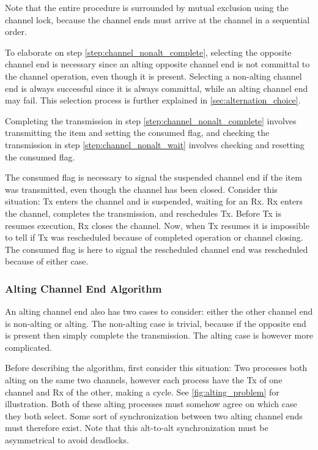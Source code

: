 Note that the entire procedure is surrounded by mutual exclusion using the channel lock, because the channel ends must arrive at the channel in a sequential order.

To elaborate on step \ref{step:channel_nonalt_complete}, selecting the opposite channel end is necessary since an alting opposite channel end is not committal to the channel operation, even though it is present. Selecting a non\hyp{}alting channel end is always successful since it is always committal, while an alting channel end may fail. This selection process is further explained in \cref{sec:alternation_choice}.

Completing the transmission in step \ref{step:channel_nonalt_complete} involves transmitting the item and setting the consumed flag, and checking the transmission in step \ref{step:channel_nonalt_wait} involves checking and resetting the consumed flag.

The consumed flag is necessary to signal the suspended channel end if the item was transmitted, even though the channel has been closed. Consider this situation: Tx enters the channel and is suspended, waiting for an Rx. Rx enters the channel, completes the transmission, and reschedules Tx. Before Tx is resumes execution, Rx closes the channel. Now, when Tx resumes it is impossible to tell if Tx was rescheduled because of completed operation or channel closing. The consumed flag is here to signal the rescheduled channel end was rescheduled because of either case.


\subsubsection{Alting Channel End Algorithm}

An alting channel end also has two cases to consider: either the other channel end is non\hyp{}alting or alting. The non\hyp{}alting case is trivial, because if the opposite end is present then simply complete the transmission. The alting case is however more complicated. 

Before describing the algorithm, first consider this situation: Two processes both alting on the same two channels, however each process have the Tx of one channel and Rx of the other, making a cycle. See \cref{fig:alting_problem} for illustration. Both of these alting processes must somehow agree on which case they both select. Some sort of synchronization between two alting channel ends must therefore exist. Note that this alt\hyp{}to\hyp{}alt synchronization must be asymmetrical to avoid deadlocks.

